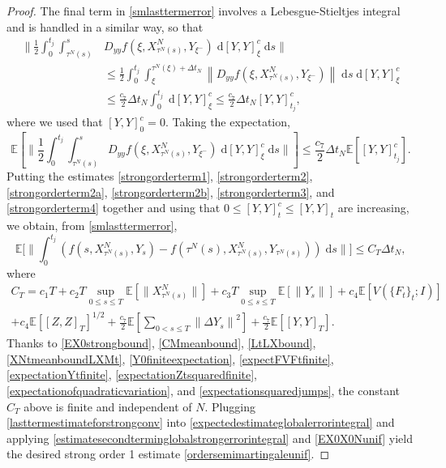 \documentclass[reqno,12pt]{amsart}
\theoremstyle{plain} %
\theoremstyle{definition} %
\begin{document}
\begin{proof}
    The final term in \cref{smlasttermerror} involves a Lebesgue-Stieltjes integral and is handled in a similar way, so that
    \begin{align*}
        \bigg\|\frac{1}{2} \int_0^{t_j} \int_{\tau^N(s)}^s & D_{yy}f(\xi, X_{\tau^N(s)}^N, Y_{\xi^-})\;\mathrm{d}[Y, Y]_\xi^c\;\mathrm{d}s \bigg\| \\
        & \leq \frac{1}{2} \int_0^{t_j} \int_{\xi}^{\tau^N(\xi) + \Delta t_N} \left\|D_{yy}f(\xi, X_{\tau^N(s)}^N, Y_{\xi^-})\right\|\;\mathrm{d}s\;\mathrm{d}[Y, Y]_\xi^c \\
        & \leq \frac{c_7}{2}\Delta t_N\int_0^{t_j} \;\mathrm{d}[Y, Y]_\xi^c \leq \frac{c_7}{2}\Delta t_N [Y, Y]_{t_j}^c,
    \end{align*}
    where we used that $[Y, Y]_0^c = 0.$ Taking the expectation,
    \begin{equation}
        \label{strongorderterm4}
        \mathbb{E}\left[\bigg\|\frac{1}{2} \int_0^{t_j} \int_{\tau^N(s)}^s D_{yy}f(\xi, X_{\tau^N(s)}^N, Y_{\xi^-})\;\mathrm{d}[Y, Y]_\xi^c\;\mathrm{d}s \bigg\|\right] \leq \frac{c_7}{2}\Delta t_N \mathbb{E}\left[[Y, Y]_{t_j}^c\right].
    \end{equation}
    Putting the estimates \cref{strongorderterm1}, \cref{strongorderterm2}, \cref{strongorderterm2a}, \cref{strongorderterm2b}, \cref{strongorderterm3}, and \cref{strongorderterm4} together and using that $0 \leq [Y, Y]_t^c \leq [Y, Y]_t$ are increasing, we obtain, from \cref{smlasttermerror},
    \begin{equation}
        \label{lasttermestimateforstrongconv}
        \mathbb{E}\bigg[\bigg\| \int_0^{t_j} \left( f(s, X_{\tau^N(s)}^N, Y_s) - f(\tau^N(s), X_{\tau^N(s)}^N, Y_{\tau^N(s)}) \right)\;\mathrm{d}s \bigg\|\bigg] \leq C_T \Delta t_N,
    \end{equation}
    where
    \begin{multline*}
            C_T = c_1 T + c_2T\sup_{0\leq s \leq T} \mathbb{E}\left[\|X_{\tau^N(s)}^N\|\right] + c_3T\sup_{0 \leq s \leq T}\mathbb{E}\left[\|Y_s\|\right] + c_4\mathbb{E}\left[ V(\{F_t\}_t; I) \right] \\
            + c_4\mathbb{E}\left[ [Z, Z]_T\right]^{1/2} + \frac{c_7}{2} \mathbb{E}\left[\sum_{0 < s \leq T}\left\| \Delta Y_s \right\|^2\right] + \frac{c_7}{2} \mathbb{E}\left[[Y, Y]_T\right].
    \end{multline*}
    Thanks to \cref{EX0strongbound}, \cref{CMmeanbound}, \cref{LtLXbound}, \cref{XNtmeanboundLXMt}, \cref{Y0finiteexpectation}, \cref{expectFVFtfinite}, \cref{expectationYtfinite}, \cref{expectationZtsquaredfinite}, \cref{expectationofquadraticvariation}, and \cref{expectationsquaredjumps}, the constant $C_T$ above is finite and independent of $N.$ Plugging \cref{lasttermestimateforstrongconv} into \cref{expectedestimateglobalerrorintegral} and applying \cref{estimatesecondterminglobalstrongerrorintegral} and \cref{EX0X0Nunif} yield the desired strong order 1 estimate \cref{ordersemimartingaleunif}.
\end{proof}
\end{document}
